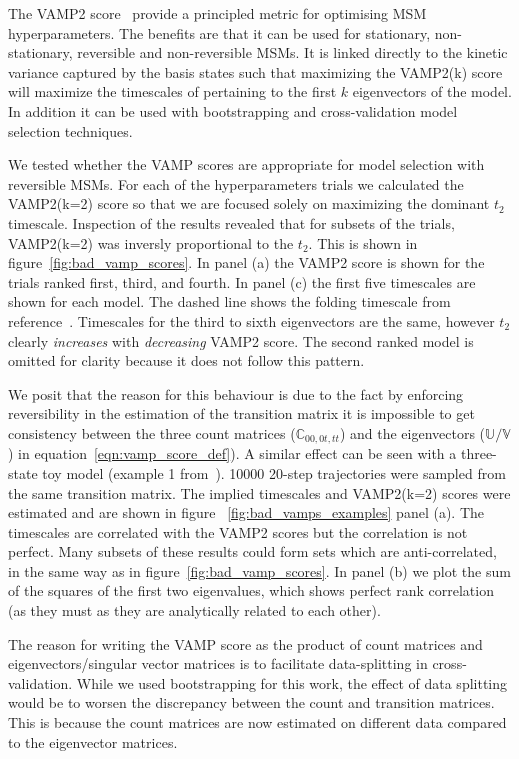 \documentclass[journal=jacsat,manuscript=article]{achemso}
\begin{document}
The VAMP2 score~\cite{wuVariationalApproachLearning2020c} provide a principled metric for optimising MSM hyperparameters. The benefits are that it can be used for stationary, non-stationary, reversible and non-reversible MSMs. It is linked directly to the kinetic variance captured by the basis states such that maximizing the VAMP2(k) score will maximize the timescales of pertaining to the first $k$ eigenvectors of the model. In addition it can be used with bootstrapping and cross-validation model selection techniques. 

We tested whether the VAMP scores are appropriate for model selection with reversible MSMs. For each of the hyperparameters trials we calculated the VAMP2(k=2) score so that we are focused solely on maximizing the dominant $t_2$ timescale. Inspection of the results revealed that for subsets of the trials, VAMP2(k=2) was inversly proportional to the $t_2$. This is shown in figure~\ref{fig:bad_vamp_scores}. In panel (a) the VAMP2 score is shown for the trials ranked first, third, and fourth. In panel (c) the first five timescales are shown for each model.  The dashed line shows the folding timescale from reference~\cite{lindorff-larsen_how_2011}. Timescales for the third to sixth eigenvectors are the same, however $t_2$ clearly \emph{increases} with \emph{decreasing} VAMP2 score. The second ranked model is omitted for clarity because it does not follow this pattern. 

We posit that the reason for this behaviour is due to the fact by enforcing reversibility in the estimation of the transition matrix it is impossible to get consistency between the three count matrices ($\mathbb{C}_{00, 0t, tt}$) and the eigenvectors ($\mathbb{U}/\mathbb{V}$) in equation~\ref{eqn:vamp_score_def}).  A similar effect can be seen with a three-state toy model (example 1 from~\cite{trendelkamp-schroer_estimation_2015}). \num{10000} 20-step trajectories were sampled from the same transition matrix. The implied timescales and VAMP2(k=2) scores were estimated and are shown in figure ~\ref{fig:bad_vamps_examples} panel (a).  The timescales are correlated with the VAMP2 scores but the correlation is not perfect. Many subsets of these results could form sets which are anti-correlated, in the same way as in figure~\ref{fig:bad_vamp_scores}. In panel (b) we plot the sum of the squares of the first two eigenvalues, which shows perfect rank correlation (as they must as they are analytically related to each other). 

The reason for writing the VAMP score as the product of count  matrices and eigenvectors/singular vector matrices is to facilitate data-splitting in cross-validation. While we used bootstrapping for this work, the effect of data splitting would be to worsen the discrepancy between the count and transition matrices. This is because the count matrices are now estimated on different data compared to the eigenvector matrices.  
\end{document}

